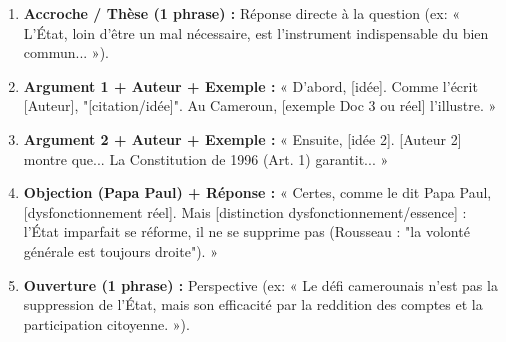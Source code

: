 \documentclass[11pt]{article}
\begin{document}
\begin{methode}
\begin{enumerate}
    \item \textbf{Accroche / Thèse (1 phrase) :} Réponse directe à la question (ex: « L'État, loin d'être un mal nécessaire, est l'instrument indispensable du bien commun... »).
    \item \textbf{Argument 1 + Auteur + Exemple :} « D'abord, [idée]. Comme l'écrit [Auteur], "[citation/idée]". Au Cameroun, [exemple Doc 3 ou réel] l'illustre. »
    \item \textbf{Argument 2 + Auteur + Exemple :} « Ensuite, [idée 2]. [Auteur 2] montre que... La Constitution de 1996 (Art. 1) garantit... »
    \item \textbf{Objection (Papa Paul) + Réponse :} « Certes, comme le dit Papa Paul, [dysfonctionnement réel]. Mais [distinction dysfonctionnement/essence] : l'État imparfait se réforme, il ne se supprime pas (Rousseau : "la volonté générale est toujours droite"). »
    \item \textbf{Ouverture (1 phrase) :} Perspective (ex: « Le défi camerounais n'est pas la suppression de l'État, mais son efficacité par la reddition des comptes et la participation citoyenne. »).
\end{enumerate}
\end{methode}
\end{document}
